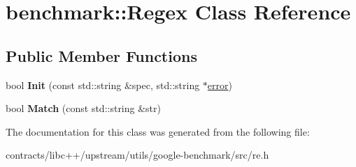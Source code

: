 \hypertarget{classbenchmark_1_1_regex}{}\section{benchmark\+:\+:Regex Class Reference}
\label{classbenchmark_1_1_regex}
\subsection*{Public Member Functions}
\begin{DoxyCompactItemize}
\item 
\mbox{\label{classbenchmark_1_1_regex_af18823ce9ef002f24f717d8d3d08c355}} 
bool {\bfseries Init} (const std\+::string \&spec, std\+::string $\ast$\mbox{\hyperlink{structerror}{error}})
\item 
\mbox{\label{classbenchmark_1_1_regex_a092ac30171acf0b1fbc6ae49d7df71ee}} 
bool {\bfseries Match} (const std\+::string \&str)
\end{DoxyCompactItemize}


The documentation for this class was generated from the following file\+:\begin{DoxyCompactItemize}
\item 
contracts/libc++/upstream/utils/google-\/benchmark/src/re.\+h\end{DoxyCompactItemize}
